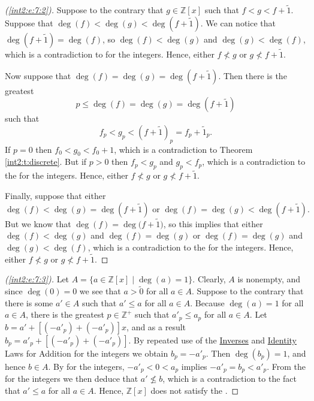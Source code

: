\begin{proof}[(\ref{int2:e:7:2})]
	Suppose to the contrary that $g \in \mathbb{Z}[x]$ such that $f < g < f + \widetilde{1}$. Suppose that $\deg(f) < \deg(g) < \deg(f + \widetilde{1})$. We can notice that $\deg(f + \widetilde{1}) = \deg(f)$, so $\deg(f) < \deg(g)$ and $\deg(g) < \deg(f)$, which is a contradiction to  for the integers. Hence, either $f \not< g$ or $g \not< f + \widetilde{1}$.

	Now suppose that $\deg(f) = \deg(g) = \deg(f + \widetilde{1})$. Then there is the greatest
	$$
		p \leq \deg(f) = \deg(g) = \deg(f + \widetilde{1})
	$$
	such that
	$$
		f_p < g_p < (f + \widetilde{1})_p = f_p + \widetilde{1}_p.
	$$
	If $p = 0$ then $f_0 < g_0 < f_0 + 1$, which is a contradiction to Theorem \ref{int2:t:discrete}. But if $p > 0$ then $f_p < g_p$ and $g_p < f_p$, which is a contradiction to the  for the integers. Hence, either $f \not< g$ or $g \not< f + \widetilde{1}$.

	Finally, suppose that either
	$$
		\deg(f) < \deg(g) = \deg(f + \widetilde{1}) \text{ or } \deg(f) = \deg(g) < \deg(f + \widetilde{1}).
	$$
	But we know that ${\deg(f) = \deg(f + \widetilde{{1}}})$, so this implies that either $\deg(f) < \deg(g)$ and $\deg(f) = \deg(g)$ or $\deg(f) = \deg(g)$ and $\deg(g) < \deg(f)$, which is a contradiction to the  for the integers. Hence, either $f \not< g$ or $g \not< f + \widetilde{1}$.
\end{proof}

\begin{proof}[(\ref{int2:e:7:3})]
	Let $A = \{ a \in \mathbb{Z}[x] \mid \deg(a) = 1 \}$. Clearly, $A$ is nonempty, and since $\deg(0) = 0$ we see that $a > \widetilde{0}$ for all $a \in A$. Suppose to the contrary that there is some $a' \in A$ such that $a' \leq a$ for all $a \in A$. Because $\deg(a) = 1$ for all $a \in A$, there is the greatest $p \in \mathbb{Z}^{+}$ such that $a'_p \leq a_p$ for all $a \in A$. Let $b = a' + [(-a'_p) + (-a'_p)]x$, and as a result $b_p = a'_p + [(-a'_p) + (-a'_p)]$. By repeated use of the \hyperref[int2:d:oid:inverses_add]{Inverses} and \hyperref[int2:d:oid:identity_add]{Identity} Laws for Addition for the integers we obtain $b_p = -a'_p$. Then $\deg(b_p) = 1$, and hence $b \in A$. By  for the integers, $-a'_p < 0 < a_p$ implies $-a'_p = b_p < a'_p$. From the  for the integers we then deduce that $a' \not\leq b$, which is a contradiction to the fact that $a' \leq a$ for all $a \in A$. Hence, $\mathbb{Z}[x]$ does not satisfy the .
\end{proof}


